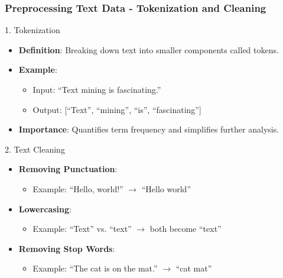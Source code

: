 \documentclass[aspectratio=169]{beamer}
\begin{document}
\begin{frame}
    \frametitle{Preprocessing Text Data - Tokenization and Cleaning}
    \begin{block}{1. Tokenization}
        \begin{itemize}
            \item \textbf{Definition}: Breaking down text into smaller components called tokens.
            \item \textbf{Example}: 
                \begin{itemize}
                    \item Input: ``Text mining is fascinating.''
                    \item Output: [``Text'', ``mining'', ``is'', ``fascinating'']
                \end{itemize}
            \item \textbf{Importance}: Quantifies term frequency and simplifies further analysis.
        \end{itemize}
    \end{block}
    
    \begin{block}{2. Text Cleaning}
        \begin{itemize}
            \item \textbf{Removing Punctuation}: 
                \begin{itemize}
                    \item Example: ``Hello, world!'' $\rightarrow$ ``Hello world''
                \end{itemize}
            \item \textbf{Lowercasing}:
                \begin{itemize}
                    \item Example: ``Text'' vs. ``text'' $\rightarrow$ both become ``text''
                \end{itemize}
            \item \textbf{Removing Stop Words}: 
                \begin{itemize}
                    \item Example: ``The cat is on the mat.'' $\rightarrow$ ``cat mat''
                \end{itemize}
        \end{itemize}
    \end{block}
\end{frame}
\end{document}

